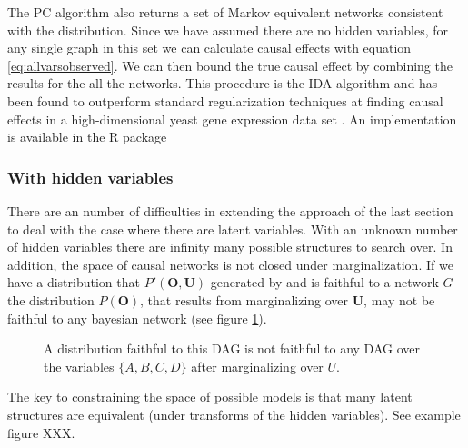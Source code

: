 \documentclass[11pt,a4paper,oneside]{book}
\begin{document}
The PC algorithm also returns a set of Markov equivalent networks consistent with the distribution. Since we have assumed there are no hidden variables, for any single graph in this set we can calculate causal effects with equation \ref{eq:allvarsobserved}. We can then bound the true causal effect by combining the results for the all the networks. This procedure is the IDA algorithm \cite{Maathuis2009} and has been found to outperform standard regularization techniques at finding causal effects in a high-dimensional yeast gene expression data set \cite{Maathuis2010}. An implementation is available in the R package \cite{Kalisch2012} 


\subsubsection{With hidden variables}
There are an number of difficulties in extending the approach of the last section to deal with the case where there are latent variables. With an unknown number of hidden variables there are infinity many possible structures to search over. In addition, the space of causal networks is not closed under marginalization. If we have a distribution that $P'(\boldsymbol{O},\boldsymbol{U})$ generated by and is faithful to a network $G$ the distribution $P(\boldsymbol{O})$, that results from marginalizing over $\boldsymbol{U}$, may not be faithful to any bayesian network (see figure \ref{fig:DAGSnotclosed}).

\begin{figure}
\centering
\caption{A distribution faithful to this DAG is not faithful to any DAG over the variables $\{A,B,C,D\}$ after marginalizing over $U$. }
\label{fig:DAGSnotclosed}
\end{figure}
 

The key to constraining the space of possible models is that many latent structures are equivalent (under transforms of the hidden variables). See example figure XXX.
\end{document}
